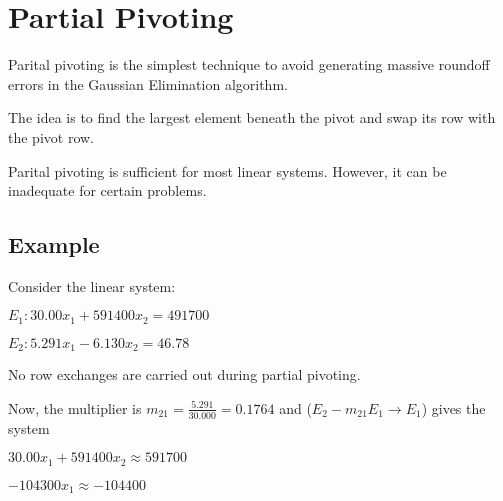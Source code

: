 \renewcommand{\arraystretch}{1.25} %
\setlength{\arraycolsep}{12pt}

\section{Partial Pivoting}

Parital pivoting is the simplest technique to avoid generating massive roundoff
errors in the Gaussian Elimination algorithm.

The idea is to find the largest element beneath the pivot and swap its row with
the pivot row.

Parital pivoting is sufficient for most linear systems. However, it can be
inadequate for certain problems.

\subsection{Example}

Consider the linear system:

\quad $E_1: 30.00x_1 + 591400x_2 = 491700$

\quad $E_2: 5.291x_1 - 6.130x_2 = 46.78$

No row exchanges are carried out during partial pivoting.

Now, the multiplier is $m_{21} = \frac{5.291}{30.000} = 0.1764$ and 
($E_2-m_{21}E_1 \to E_1$) gives the system

\quad $30.00x_1 + 591400x_2 \approx 591700$

\quad $-104300x_1 \approx -104400$

